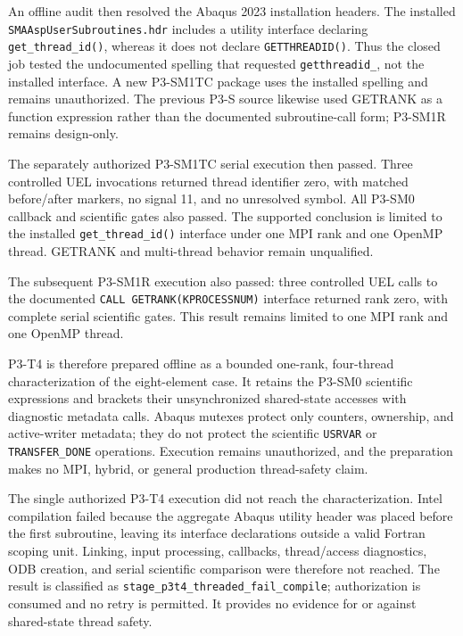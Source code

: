 An offline audit then resolved the Abaqus 2023 installation headers.  The
installed \texttt{SMAAspUserSubroutines.hdr} includes a utility interface
declaring \texttt{get\_thread\_id()}, whereas it does not declare
\texttt{GETTHREADID()}.  Thus the closed job tested the undocumented spelling
that requested \texttt{getthreadid\_}, not the installed interface.  A new
P3-SM1TC package uses the installed spelling and remains unauthorized.  The
previous P3-S source likewise used GETRANK as a function expression rather
than the documented subroutine-call form; P3-SM1R remains design-only.

The separately authorized P3-SM1TC serial execution then passed.  Three
controlled UEL invocations returned thread identifier zero, with matched
before/after markers, no signal 11, and no unresolved symbol.  All P3-SM0
callback and scientific gates also passed.  The supported conclusion is
limited to the installed \texttt{get\_thread\_id()} interface under one MPI
rank and one OpenMP thread.  GETRANK and multi-thread behavior remain
unqualified.

The subsequent P3-SM1R execution also passed: three controlled UEL calls to
the documented \texttt{CALL GETRANK(KPROCESSNUM)} interface returned rank
zero, with complete serial scientific gates.  This result remains limited to
one MPI rank and one OpenMP thread.

P3-T4 is therefore prepared offline as a bounded one-rank, four-thread
characterization of the eight-element case.  It retains the P3-SM0 scientific
expressions and brackets their unsynchronized shared-state accesses with
diagnostic metadata calls.  Abaqus mutexes protect only counters, ownership,
and active-writer metadata; they do not protect the scientific
\texttt{USRVAR} or \texttt{TRANSFER\_DONE} operations.  Execution remains
unauthorized, and the preparation makes no MPI, hybrid, or general production
thread-safety claim.

The single authorized P3-T4 execution did not reach the characterization.
Intel compilation failed because the aggregate Abaqus utility header was
placed before the first subroutine, leaving its interface declarations outside
a valid Fortran scoping unit.  Linking, input processing, callbacks,
thread/access diagnostics, ODB creation, and serial scientific comparison
were therefore not reached.  The result is classified as
\texttt{stage\_p3t4\_threaded\_fail\_compile}; authorization is consumed and
no retry is permitted.  It provides no evidence for or against shared-state
thread safety.

